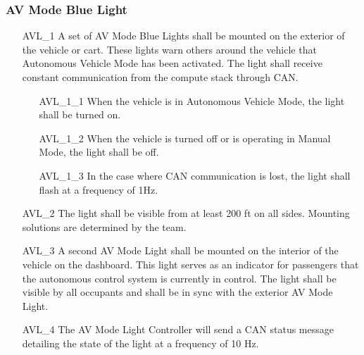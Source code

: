\subsubsection{AV Mode Blue Light}
\begin{itemize}
    \item[AVL\_1] A set of AV Mode Blue Lights shall be mounted on the exterior of the vehicle or cart. These lights warn others around the vehicle that Autonomous Vehicle Mode has been activated. The light shall receive constant communication from the compute stack through CAN.
    \begin{itemize}
        \item[AVL\_1\_1] When the vehicle is in Autonomous Vehicle Mode, the light shall be turned on.
        \item[AVL\_1\_2] When the vehicle is turned off or is operating in Manual Mode, the light shall be off.
        \item[AVL\_1\_3] In the case where CAN communication is lost, the light shall flash at a frequency of 1Hz.
    \end{itemize}
    \item[AVL\_2] The light shall be visible from at least 200 ft on all sides. Mounting solutions are determined by the team.
    \item[AVL\_3] A second AV Mode Light shall be mounted on the interior of the vehicle on the dashboard. This light serves as an indicator for passengers that the autonomous control system is currently in control. The light shall be visible by all occupants and shall be in sync with the exterior AV Mode Light.
    \item[AVL\_4] The AV Mode Light Controller will send a CAN status message detailing the state of the light at a frequency of 10 Hz.
\end{itemize}